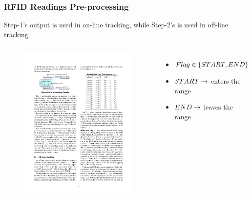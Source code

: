 
\begin{frame}
\frametitle{RFID Readings Pre-processing}

  \small{Step-1's output is used in on-line tracking, while Step-2's is used in off-line tracking}

  \begin{columns}[c]

    \begin{figure}[tb]
      \includegraphics[width=\columnwidth]{figures/2-1-8.pdf}
    \end{figure}

    \begin{itemize}
        \item $\mathnormal{Flag \in \{ START, END \}}$
        \item $\mathnormal{START} \rightarrow$ \textrm{enters the range}
        \item $\mathnormal{END} \rightarrow$ \textrm{leaves the range}
    \end{itemize}

  \end{columns}

\end{frame}

